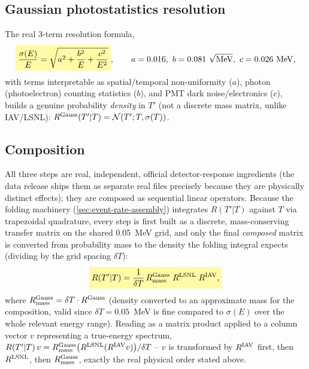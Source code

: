 \begin{theorybox}
\subsection*{Gaussian photostatistics resolution}
The real 3-term resolution formula,
\begin{equation}
  \keyresult{\frac{\sigma(E)}{E} = \sqrt{a^2+\frac{b^2}{E}+\frac{c^2}{E^2}}},
  \qquad a=0.016,\ b=0.081\ \sqrt{\rm MeV},\ c=0.026\ {\rm MeV},
  \label{eq:eres-formula}
\end{equation}
with terms interpretable as spatial/temporal non-uniformity ($a$), photon
(photoelectron) counting statistics ($b$), and PMT dark noise/electronics
($c$), builds a genuine probability \emph{density} in $T'$ (not a discrete
mass matrix, unlike IAV/LSNL): $R^{\rm Gauss}(T'|T) =
\mathcal N(T';T,\sigma(T))$.

\subsection*{Composition}
All three steps are real, independent, official detector-response
ingredients (the data release ships them as separate real files precisely
because they are physically distinct effects); they are composed as
sequential linear operators. Because the folding machinery
(\cref{sec:event-rate-assembly}) integrates $R(T'|T)$ against $T$ via
trapezoidal quadrature, every step is first built as a discrete,
mass-conserving transfer matrix on the shared 0.05~MeV grid, and only the
final \emph{composed} matrix is converted from probability mass to the
density the folding integral expects (dividing by the grid spacing $\delta
T$):
\begin{equation}
  \keyresult{R(T'|T) = \frac{1}{\delta T}\,
    R^{\rm Gauss}_{\rm mass}\;R^{\rm LSNL}\;R^{\rm IAV},}
  \label{eq:response-composition}
\end{equation}
where $R^{\rm Gauss}_{\rm mass} = \delta T\cdot R^{\rm Gauss}$ (density
converted to an approximate mass for the composition, valid since $\delta
T=0.05$~MeV is fine compared to $\sigma(E)$ over the whole relevant
energy range). Reading  as a matrix
product applied to a column vector $v$ representing a true-energy
spectrum, $R(T'|T)\,v = R^{\rm Gauss}_{\rm mass}\bigl(R^{\rm LSNL}(R^{\rm
IAV}v)\bigr)/\delta T$ -- $v$ is transformed by $R^{\rm IAV}$ first, then
$R^{\rm LSNL}$, then $R^{\rm Gauss}_{\rm mass}$, exactly the real physical
order stated above.
\end{theorybox}

